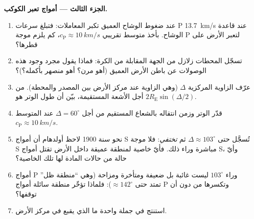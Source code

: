 \begin{problem}
\medskip\noindent\textbf{الجزء الثالث --- أمواج تعبر الكوكب.}
\begin{enumerate}[resume]
  \item عند ضغوط الوشاح العميق تكبر المعاملات: فتبلغ سرعات P
        \qty{13.7}{km/s} عند قاعدة الوشاح. بأخذ متوسط تقريبي
        $c_{\text{P}} \approx \qty{10}{km/s}$، كم يلزم موجة P
        لتعبر الأرض على قطرها؟
  \item تسجّل المحطات زلازل من الجهة المقابلة من الكرة:
        فماذا يقول مجرد وجود هذه الوصولات عن باطن الأرض
        العميق (أهو مرن؟ أهو منصهر بأكمله؟)؟
  \item عرّف الزاوية المركزية $\Delta$ (وهي الزاوية عند مركز
        الأرض بين المصدر والمحطة). من أجل الأشعة المستقيمة، بيّن
        أن طول الوتر هو $2R_{\text{E}}\sin(\Delta/2)$.
  \item قدّر الوتر وزمن انتقاله بالشعاع المستقيم من أجل
        $\Delta = 60^\circ$ عند المتوسط $c_{\text{P}} \approx
        \qty{10}{km/s}$.
  \item نحو سنة 1900 لاحظ أولدهام أن أمواج S تُسجَّل حتى
        $\Delta \approx 103^\circ$ ثم \emph{تختفي}: فلا موجة S
        مباشرة وراء ذلك. فأيّ خاصية لمنطقة عميقة داخل الأرض
        تقتل أمواج S، وأيّ حالة من حالات المادة لها تلك
        الخاصية؟
  \item أمواج P وراء $103^\circ$ ليست غائبة بل ضعيفة
        ومتأخرة ومزاحة (وهي ``منطقة ظل'' تمتد حتى
        $\approx 142^\circ$): فلماذا تؤخّر منطقة سائلة أمواج P
        وتكسرها من دون أن توقفها؟
  \item استنتج في جملة واحدة ما الذي يقبع في مركز
        الأرض.
\end{enumerate}


\end{problem}
